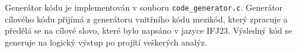 \documentclass[../main.tex]{subfiles}
\begin{document}
Generátor kódu je implementován v souboru \texttt{code\_generator.c}.
Generátor cílového kódu přijímá z generátoru vnitřního kódu mezikód, který zpracuje a předělá se na cílové slovo, které bylo napsáno v jazyce IFJ23. Výsledný kód se generuje na logický výstup po projítí veškerých analýz.
\end{document}
